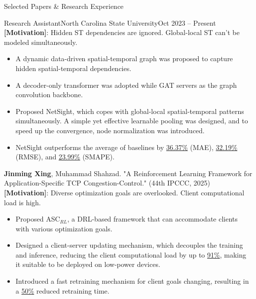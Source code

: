 \documentclass[]{mcdowellcv}
\begin{document}
\begin{cvsection}{Selected Papers \& Research Experience}
\begin{cvsubsection}{Research Assistant}{North Carolina State University}{Oct 2023 -- Present}
        \textbf{[Motivation]}: Hidden ST dependencies are ignored. Global-local ST can't be modeled simultaneously.
        \begin{itemize}
            \item A dynamic data-driven spatial-temporal graph was proposed to capture hidden spatial-temporal dependencies.
            \item A decoder-only transformer was adopted while GAT servers as the graph convolution backbone.
            \item Proposed NetSight, which copes with global-local spatial-temporal patterns simultaneously. A simple yet effective learnable pooling was designed, and to speed up the convergence, node normalization was introduced.
            \item NetSight outperforms the average of baselines by \underline{36.37\%} (MAE), \underline{32.19\%} (RMSE), and \underline{23.99\%} (SMAPE).
        \end{itemize}
        \vspace{5pt}
        \textbf{Jinming Xing}, Muhammad Shahzad. "A Reinforcement Learning Framework for Application-Specific TCP Congestion-Control." (44th IPCCC, 2025)\newline
        \textbf{[Motivation]}: Diverse optimization goals are overlooked. Client computational load is high.
        \begin{itemize}
            \item Proposed ASC$_{RL}$, a DRL-based framework that can accommodate clients with various optimization goals.
            \item Designed a client-server updating mechanism, which decouples the training and inference, reducing the client computational load by up to \underline{91\%}, making it suitable to be deployed on low-power devices.
            \item Introduced a fast retraining mechanism for client goals changing, resulting in a \underline{50\%} reduced retraining time.
        \end{itemize}



\end{cvsubsection}
\end{cvsection}
\end{document}
